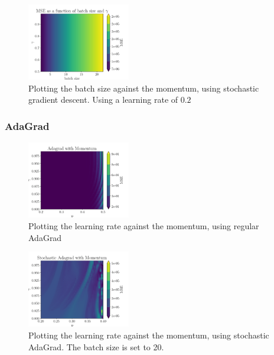 \documentclass[aps,pra,english,notitlepage,reprint,nofootinbib]{revtex4-1}  %
\begin{document}
\begin{figure}[ht!]
    \centering
    \includegraphics[width = 0.4\textwidth]{../figs/SGD_batch_gamma.pdf}
    \caption{Plotting the batch size against the momentum, using stochastic gradient descent. Using a learning rate of $0.2$}
    \label{fig: SGD_batch_gamma}
\end{figure}

\subsubsection{AdaGrad}
\begin{figure}[ht!]
    \centering
    \includegraphics[width = 0.4\textwidth]{../figs/AdagradMomentum_eta_gamma.pdf}
    \caption{Plotting the learning rate against the momentum, using regular AdaGrad}
    \label{fig: AdagradMomentum_eta_gamma}
\end{figure}

\begin{figure}[ht!]
    \centering
    \includegraphics[width = 0.4\textwidth]{../figs/AdagradMomentum_stochastic_eta_gamma.pdf}
    \caption{Plotting the learning rate against the momentum, using stochastic AdaGrad. The batch size is set to 20.}
    \label{fig: AdagradMomentum_stochastic_eta_gamma}
\end{figure}
\end{document}
